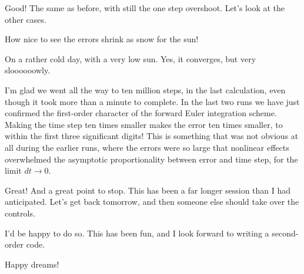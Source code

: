 \cba

\abc

\bob
Good!  The same as before, with still the one step overshoot.  Let's
look at the other cases.

\cba


\abc

\bob
How nice to see the errors shrink as snow for the sun!

\carol
On a rather cold day, with a very low sun.  Yes, it converges, but
very sloooooowly.

\alice
I'm glad we went all the way to ten million steps, in the last
calculation, even though it took more than a minute to complete.
In the last two runs we have just confirmed the first-order character
of the forward Euler integration scheme.  Making the time step ten
times smaller makes the error ten times smaller, to within the first
three significant digits!  This is something that was not obvious at
all during the earlier runs, where the errors were so large that
nonlinear effects overwhelmed the asymptotic proportionality between
error and time step, for the limit $dt \rightarrow 0$.

\carol
Great!  And a great point to stop.  This has been a far longer session
than I had anticipated.  Let's get back tomorrow, and then someone
else should take over the controls.

\bob
I'd be happy to do so.  This has been fun, and I look forward to
writing a second-order code.

\alice
Happy dreams!

\cba
